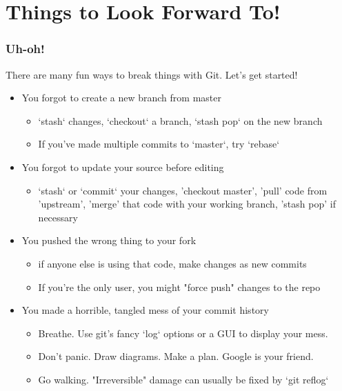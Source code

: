 \documentclass[unknownkeysallowed]{beamer}
\begin{document}
\section{Things to Look Forward To!}
\begin{frame}
    \frametitle{Uh-oh!}
    \vspace{0.25cm}
    There are many fun ways to break things with Git. Let's get started!
    \begin{itemize}
        \item{You forgot to create a new branch from master}
        \begin{itemize}
            \item{`stash` changes, `checkout` a branch, `stash pop` on the new branch}
            \item{If you've made multiple commits to `master`, try `rebase`}
        \end{itemize}
        \item{You forgot to update your source before editing}
        \begin{itemize}
            \item{`stash` or `commit` your changes, 'checkout master', 'pull' code from 'upstream', 'merge' that code with your working branch, 'stash pop' if necessary}
        \end{itemize}
        \item{You pushed the wrong thing to your fork}
        \begin{itemize}
            \item{if anyone else is using that code, make changes as new commits}
            \item{If you're the only user, you might "force push" changes to the repo}
        \end{itemize}
        \item{You made a horrible, tangled mess of your commit history}
        \begin{itemize}
            \item{Breathe. Use git's fancy `log` options or a GUI to display your mess.}
            \item{Don't panic. Draw diagrams. Make a plan. Google is your friend.}
            \item{Go walking. "Irreversible" damage can usually be fixed by `git reflog`}
        \end{itemize}
    \end{itemize}
\end{frame}
\end{document}
